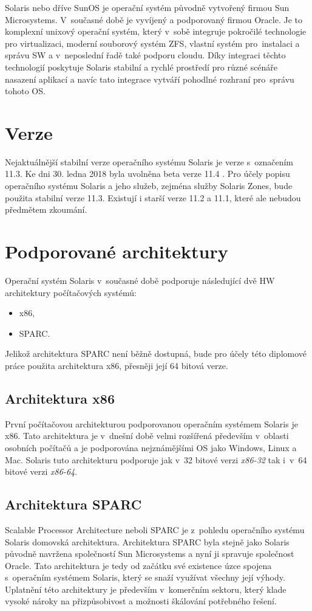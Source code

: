 Solaris nebo dříve SunOS je operační systém původně vytvořený firmou Sun Microsystems. V~současné době je vyvíjený a podporovaný
firmou Oracle. Je to komplexní unixový operační systém, který v~sobě integruje pokročilé technologie pro virtualizaci, moderní
souborový systém ZFS, vlastní systém pro~instalaci a správu SW a v~neposlední řadě také podporu cloudu. Díky integraci těchto
technologií poskytuje Solaris stabilní a rychlé prostředí pro různé scénáře nasazení aplikací a navíc tato integrace vytváří
pohodlné rozhraní pro~správu tohoto OS. 
\section{Verze}
\label{chapter:solaris:version}
Nejaktuálnější stabilní verze operačního systému Solaris je verze s~označením 11.3. Ke dni 30. ledna 2018 byla uvolněna beta
verze 11.4 \cite{oracle:solaris:beta}. Pro účely popisu operačního systému Solaris a jeho služeb, zejména služby Solaris Zones,
bude použita stabilní verze 11.3. Existují i starší verze 11.2 a 11.1, které ale nebudou předmětem zkoumání.
\section{Podporované architektury}
\label{chapter:solaris:support}
Operační systém Solaris v~současné době podporuje následující dvě HW architektury počítačových systémů:
\begin{itemize}
 \item x86,
 \item SPARC.
\end{itemize}
Jelikož architektura SPARC není běžně dostupná, bude pro účely této diplomové práce použita architektura x86, přesněji
její 64 bitová verze.
\subsection{Architektura x86}
\label{chapter:solaris:support:x86}
První počítačovou architekturou podporovanou operačním systémem Solaris je x86. Tato architektura je v~dnešní době velmi rozšířená
především v~oblasti osobních počítačů a je podporována nejznámějšími OS jako Windows, Linux a Mac. Solaris tuto architekturu
podporuje jak v~32 bitové verzi \textit{x86-32} tak i~v~64 bitové verzi \textit{x86-64}.
\subsection{Architektura SPARC}
\label{chapter:solaris:support:sparc}
Scalable Processor Architecture neboli SPARC je z~pohledu operačního systému Solaris domovská architektura. Architektura SPARC
byla stejně jako Solaris původně navržena společností Sun Microsystems a nyní ji spravuje společnost Oracle. Tato architektura
je tedy od začátku své existence úzce spojena s~operačním systémem Solaris, který se snaží využívat všechny její výhody.
Uplatnění této architektury je především v~komerčním sektoru, který klade vysoké nároky na přizpůsobivost a možnosti škálování
potřebného řešení.
